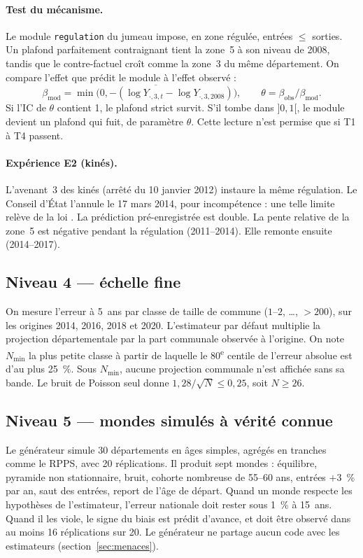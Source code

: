\documentclass[11pt]{article}
\begin{document}
\paragraph{Test du mécanisme.} Le module \texttt{regulation} du jumeau impose, en zone régulée,
entrées $\le$ sorties. Un plafond parfaitement contraignant tient la zone~5 à son niveau de 2008,
tandis que le contre-factuel croît comme la zone~3 du même département. On compare l'effet que
prédit le module à l'effet observé :
\[
  \beta_{\text{mod}} = \overline{\min\bigl(0, -(\log Y_{\cdot,3,t} - \log Y_{\cdot,3,2008})\bigr)},
  \qquad \theta = \beta_{\text{obs}} / \beta_{\text{mod}} .
\]
Si l'IC de $\theta$ contient 1, le plafond strict survit. S'il tombe dans $]0, 1[$, le module devient
un plafond qui fuit, de paramètre $\theta$. Cette lecture n'est permise que si T1 à T4 passent.

\paragraph{Expérience E2 (kinés).} L'avenant~3 des kinés (arrêté du 10 janvier 2012) instaure la même
régulation. Le Conseil d'État l'annule le 17 mars 2014, pour incompétence : une telle limite relève
de la loi \citep{ce2014mk}. La prédiction pré-enregistrée est double. La pente relative de la zone~5
est négative pendant la régulation (2011--2014). Elle remonte ensuite (2014--2017).

\subsection{Niveau 4 --- échelle fine}
On mesure l'erreur à 5~ans par classe de taille de commune ($1$--$2$, \dots, $>200$), sur les
origines 2014, 2016, 2018 et 2020. L'estimateur par défaut multiplie la projection départementale
par la part communale observée à l'origine. On note $N_{\min}$ la plus petite classe à partir de
laquelle le 80\textsuperscript{e} centile de l'erreur absolue est d'au plus 25\suppose{}~\%. Sous
$N_{\min}$, aucune projection communale n'est affichée sans sa bande. Le bruit de Poisson seul
donne $1{,}28/\sqrt{N} \le 0{,}25$, soit $N \ge 26$\derive{}.

\subsection{Niveau 5 --- mondes simulés à vérité connue}
Le générateur simule 30 départements en âges simples, agrégés en tranches comme le RPPS, avec
20 réplications. Il produit sept mondes : équilibre, pyramide non stationnaire, bruit, cohorte
nombreuse de 55--60 ans, entrées $+3$~\% par an, saut des entrées, report de l'âge de départ.
Quand un monde respecte les hypothèses de l'estimateur, l'erreur nationale doit rester sous
1\suppose{}~\% à 15~ans. Quand il les viole, le signe du biais est prédit d'avance, et doit être
observé dans au moins 16 réplications sur 20. Le générateur ne partage aucun code avec les
estimateurs (section~\ref{sec:menaces}).
\end{document}
